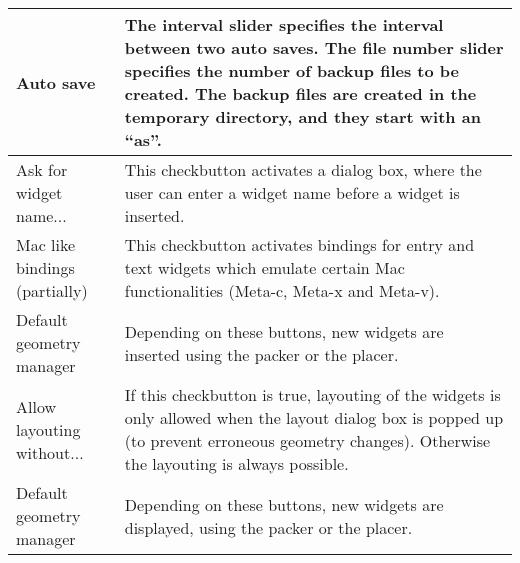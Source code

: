 {\newpage
\clearpage
\samepage \begin{figure}[hbt]
  \centerline{
  \epsfysize=13.5cm
  }

  \label{fig:The procedure XFProcOptionsGeneral}
\end{figure}
}

{\newpage
\clearpage
\samepage \begin{supertabular}{|l|p{6.5cm}|}
Auto save                    & The interval slider specifies
                               the interval between two auto
                               saves. The file number slider
                               specifies the number of
                               backup files to be created.
                               The backup files are created
                               in the temporary directory,
                               and they start with an ``as''.\\  \hline
Ask for widget name...       & This checkbutton activates a
                               dialog box, where the user
                               can enter a widget name
                               before a widget is inserted.\\  \hline
Mac like bindings (partially)& This checkbutton activates
                               bindings for entry and text
                               widgets which emulate certain
                               Mac functionalities (Meta-c,
                               Meta-x and Meta-v).\\  \hline
Default geometry manager     & Depending on these buttons,
                               new widgets are inserted
                               using the packer or the
                               placer.\\  \hline
Allow layouting without...   & If this checkbutton is true,
                               layouting of the widgets is
                               only allowed when the layout
                               dialog box is popped up (to
                               prevent erroneous geometry
                               changes). Otherwise the
                               layouting is always
                               possible.\\  \hline
Default geometry manager     & Depending on these buttons,
                               new widgets are displayed,
                               using the packer or the
                               placer.\\  \hline

\end{supertabular}}
